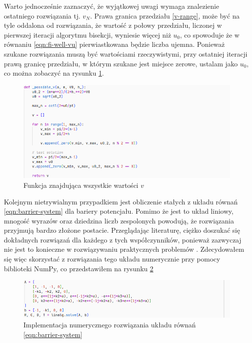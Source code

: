 \documentclass{SGGW-thesis}
\begin{document}
Warto jednocześnie zaznaczyć, że wyjątkowej uwagi wymaga znalezienie ostatniego rozwiązania tj. $v_N$. Prawa granica przedziału \ref{v-range}, może być na tyle oddalona od rozwiązania, że wartość z połowy przedziału, liczonej w pierwszej iteracji algorytmu bisekcji, wyniesie więcej niż $u_0$, co spowoduje że w równaniu \ref{eqn:fi-well-vu} pierwiastkowana będzie liczba ujemna. Ponieważ szukane rozwiązania muszą być wartościami rzeczywistymi, przy ostatniej iteracji prawą granicę przedziału, w którym szukane jest miejsce zerowe, ustalam jako $u_0$, co można zobaczyć na rysunku \ref{fig:bisection2}.
	\begin{figure}[H]
		\includegraphics[width=\textwidth,height=\textheight,keepaspectratio]{bisection2.png} 
		\caption{Funkcja znajdująca wszystkie wartości $v$}
		\label{fig:bisection2}
	\end{figure}
	
	Kolejnym nietrywialnym przypadkiem jest obliczenie stałych z układu równań \ref{eqn:barrier-system} dla bariery potencjału. Pomimo że jest to układ liniowy, mnogość wyrazów oraz dziedzina liczb zespolonych powodują, że rozwiązania przyjmują bardzo złożone postacie. Przeglądając literaturę, ciężko doszukać się dokładnych rozwiązań dla każdego z tych współczynników, ponieważ zazwyczaj nie jest to konieczne w rozwiązywaniu praktycznych problemów \cite{fiz atom} \cite{mechanika kwant} \cite{fiz kwant}. Zdecydowałem się więc skorzystać z rozwiązania tego układu numerycznie przy pomocy biblioteki NumPy, co przedstawiłem na rysunku \ref{fig:linalg-solve}
	
	\begin{figure}[H]
		\includegraphics[width=\textwidth,height=\textheight,keepaspectratio]{linalg solve.png} 
		\caption{Implementacja numerycznego rozwiązania układu równań \ref{eqn:barrier-system}}
		\label{fig:linalg-solve}
	\end{figure}
\end{document}
